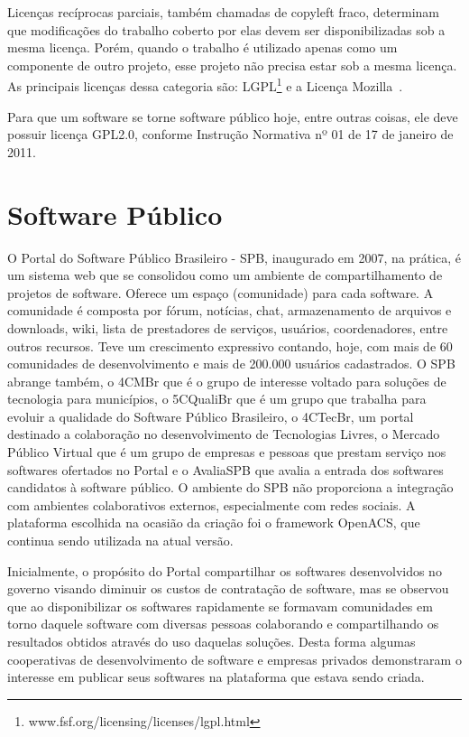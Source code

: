 Licenças recíprocas parciais, também chamadas de copyleft fraco, determinam que
modificações do trabalho coberto por elas devem ser disponibilizadas sob a mesma 
licença. Porém, quando o trabalho é utilizado apenas como um componente de outro 
projeto, esse projeto não precisa estar sob a mesma licença. As principais licenças
dessa categoria são: LGPL\footnote{www.fsf.org/licensing/licenses/lgpl.html} e a
Licença Mozilla~\cite{sabino2009licenccas}.

Para que um software se torne software público hoje, entre outras coisas, ele deve
possuir licença GPL2.0, conforme Instrução Normativa nº 01 de 17 de janeiro de 2011.   

\section{Software Público}

O Portal do Software Público Brasileiro - SPB, inaugurado em 2007, na prática, é um sistema
web que se consolidou como um ambiente de compartilhamento de projetos de software. Oferece um
espaço (comunidade) para cada software. A comunidade é composta por fórum, notícias, chat, 
armazenamento de arquivos e downloads, wiki, lista de prestadores de serviços, usuários, coordenadores,
entre outros recursos. Teve um crescimento expressivo contando, hoje, com mais de 60 comunidades
de desenvolvimento e mais de 200.000 usuários cadastrados. O SPB abrange também, o 4CMBr que
é o grupo de interesse voltado para soluções de tecnologia para municípios, o 5CQualiBr que é um
grupo que trabalha para evoluir a qualidade do Software Público Brasileiro, o 4CTecBr, um portal
destinado a colaboração no desenvolvimento de Tecnologias Livres, o Mercado Público Virtual que
é um grupo de empresas e pessoas que prestam serviço nos softwares ofertados no Portal e o 
AvaliaSPB que avalia a entrada dos softwares candidatos à software público. O ambiente do SPB não
proporciona a integração com ambientes colaborativos externos, especialmente com redes sociais. A
plataforma escolhida na ocasião da criação foi o framework OpenACS, que continua sendo utilizada
na atual versão.

Inicialmente, o propósito do Portal compartilhar os softwares desenvolvidos
no governo visando diminuir os custos de contratação de software, mas se observou
que ao disponibilizar os softwares rapidamente se formavam comunidades em torno 
daquele software com diversas pessoas colaborando e compartilhando os resultados
obtidos através do uso daquelas soluções. Desta forma algumas cooperativas de 
desenvolvimento de software e empresas privados demonstraram o interesse em
publicar seus softwares na plataforma que estava sendo criada.

